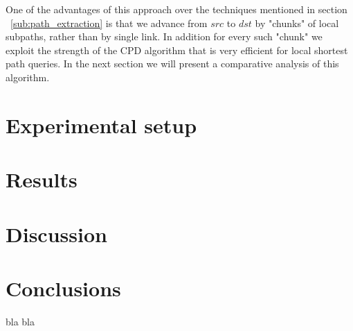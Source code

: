 \documentclass[runningheads,a4paper]{llncs}
\begin{document}
One of the advantages of this approach over the techniques mentioned in section ~\ref{sub:path_extraction} is that we advance from $src$ to $dst$ by "chunks"
of local subpaths, rather than by single link. In addition for every such "chunk" we exploit the strength of the CPD algorithm that is
very efficient for local shortest path queries. In the next section we will present a comparative analysis of this algorithm.

\section{Experimental setup}

\section{Results}

\section{Discussion}

\section{Conclusions}

bla bla~\cite{bast06}



\end{document}
